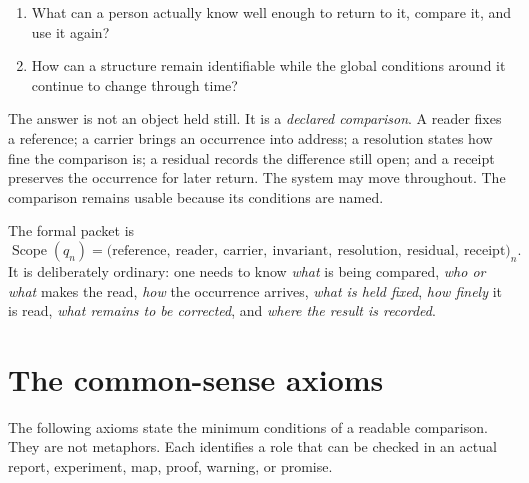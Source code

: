 \documentclass[11pt]{article}
\newcommand{\scope}{\operatorname{Scope}}
\begin{document}
\begin{enumerate}[label=\arabic*.,leftmargin=2em,itemsep=.3em]
\item What can a person actually know well enough to return to it, compare it, and use it again?
\item How can a structure remain identifiable while the global conditions around it continue to change through time?
\end{enumerate}

The answer is not an object held still. It is a \emph{declared comparison}. A reader fixes a reference; a carrier brings an occurrence into address; a resolution states how fine the comparison is; a residual records the difference still open; and a receipt preserves the occurrence for later return. The system may move throughout. The comparison remains usable because its conditions are named.

The formal packet is
\begin{equation}
\scope(q_n)=
\bigl(\mathrm{reference},\ \mathrm{reader},\ \mathrm{carrier},\ \mathrm{invariant},\ \mathrm{resolution},\ \mathrm{residual},\ \mathrm{receipt}\bigr)_n.
\label{eq:scope}
\end{equation}
It is deliberately ordinary: one needs to know \emph{what} is being compared, \emph{who or what} makes the read, \emph{how} the occurrence arrives, \emph{what is held fixed}, \emph{how finely} it is read, \emph{what remains to be corrected}, and \emph{where the result is recorded}.

\section{The common-sense axioms}
The following axioms state the minimum conditions of a readable comparison. They are not metaphors. Each identifies a role that can be checked in an actual report, experiment, map, proof, warning, or promise.
\end{document}
